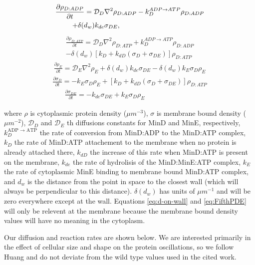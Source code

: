 \documentclass[letterpaper,twocolumn,amsmath,amssymb,pre]{revtex4-1}
\begin{document}
\begin{multline}
  \frac{\partial \rho_{D:ADP}}{\partial t} = \mathcal{D}_D\nabla^2\rho_{D:ADP}-k_D^{ADP\rightarrow ATP}\rho_{D:ADP}\\
  +\delta(d_w)k_{de}\sigma_{DE},\hspace{3.4cm}
\end{multline}
\begin{multline}
  \frac{\partial \rho_{D:ATP}}{\partial t} = \mathcal{D}_D\nabla^2\rho_{D:ATP}+k_D^{ADP\rightarrow ATP}\rho_{D:ADP}\\
  -\delta(d_w)[k_D+k_{dD}(\sigma_D+\sigma_{DE})]\rho_{D:ATP}
\end{multline}
\begin{multline}
  \frac{\partial \rho_E}{\partial t} = \mathcal{D}_E\nabla^2\rho_E+\delta(d_w)k_{de}\sigma_{DE}
  -\delta(d_w)k_E \sigma_D \rho_E
\end{multline}
\begin{multline}
  \frac{\partial \sigma_D}{\partial t} = -k_E\sigma_D\rho_E
  +[k_D+k_{dD}(\sigma_D+\sigma_{DE})]\rho_{D:ATP}
  \label{eq:d-on-wall}
\end{multline}
\begin{multline}
  \frac{\partial \sigma_{DE}}{\partial t} = -k_{de}\sigma_{DE}+k_E\sigma_D\rho_E\hspace{3cm}
  \label{eq:FifthPDE}
\end{multline}

where $\rho$ is cytoplasmic protein density ($\mu m^{-3}$), $\sigma$
is membrane bound density ($\mu m^{-2}$), $\mathcal{D}_D$ and
$\mathcal{D}_{E}$ th diffusions constants for MinD and MinE,
respectively, $k_D^{\textrm{ADP $\rightarrow$ ATP}}$ the rate of
conversion from MinD:ADP to the MinD:ATP complex, $k_D$ the rate of
MinD:ATP attachement to the membrane when no protein is already
attached there, $k_{dD}$ the increase of this rate when MinD:ATP is
present on the membrane, $k_{de}$ the rate of hydrolisis of the
MinD:MinE:ATP complex, $k_E$ the rate of cytoplasmic MinE binding to
membrane bound MinD:ATP complex, and $d_w$ is the distance from the
point in space to the closest wall (which will always be
perpendicular to this distance).  $\delta(d_w)$ has units of
$\mu m^{-1}$ and will be zero everywhere except at the wall.
Equations \ref{eq:d-on-wall} and \ref{eq:FifthPDE} will only be
relevent at the membrane because the membrane bound density values
will have no meaning in the cytoplasm.

Our diffusion and reaction rates are shown below.  We are interested
primarily in the effect of cellular size and shape on the protein
oscillations, so we follow Huang\cite{huang2003dynamic} and do not
deviate from the wild type values used in the cited work.
\end{document}
